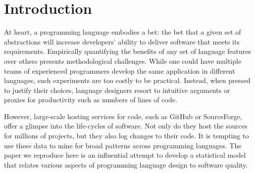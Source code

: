 \documentclass[acmsmall]{acmart}
\newcommand{\gh}{{GitHub}\xspace}
\begin{document}
\renewcommand{\cite}{\citep}

\section{Introduction}

At heart, a programming language embodies a bet: the bet that a given set of
abstractions will increase developers' ability to deliver software that
meets its requirements.  Empirically quantifying the benefits of any set of
language features over others presents methodological challenges. While one
could have multiple teams of experienced programmers develop the same
application in different languages, such experiments are too costly to be
practical. Instead, when pressed to justify their choices, language
designers resort to intuitive arguments or proxies for productivity such as
numbers of lines of code.

However, large-scale hosting services for code, such as \gh or
Source\-Forge, offer a glimpse into the life-cycles of software.  Not only
do they host the sources for millions of projects, but they also log changes
to their code. It is tempting to use these data to mine for broad patterns
across programming languages. The paper we reproduce here is an influential
attempt to develop a statistical model that relates various aspects of
programming language design to software quality.
\end{document}
